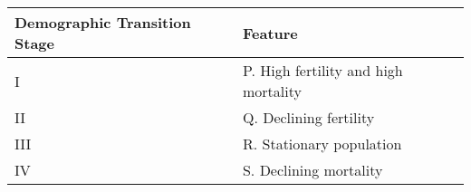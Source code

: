 \begin{tabular}{|p{1.5in}|p{3in}|}
\hline
Demographic Transition Stage & Feature \\
\hline
I  &  P. High fertility and high mortality \\
\hline
II  & Q.  Declining fertility \\
\hline
III & R. Stationary population \\
\hline
IV  & S. Declining mortality \\
\hline
\end{tabular}